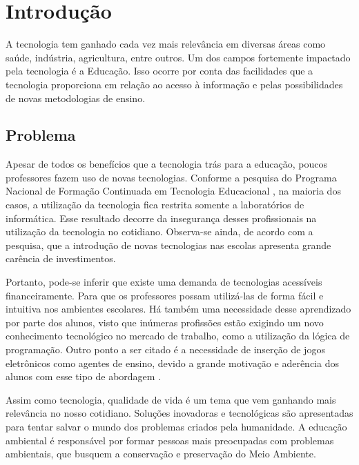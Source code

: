 
\chapter{Introdução}\label{intro}

A tecnologia tem ganhado cada vez mais relevância em diversas áreas como saúde, indústria, agricultura, entre outros. Um dos campos fortemente impactado pela tecnologia é a Educação. Isso ocorre por conta das facilidades que a tecnologia proporciona em relação ao acesso à informação e pelas possibilidades de novas metodologias de ensino. 


\section{Problema}

Apesar de todos os benefícios que a tecnologia trás para a educação, poucos professores fazem uso de novas tecnologias. Conforme a pesquisa do Programa Nacional de Formação Continuada em Tecnologia Educacional \cite{suenia_andre_2012} , na maioria dos casos, a utilização da tecnologia fica restrita somente a laboratórios de informática. Esse resultado decorre da insegurança desses profissionais na utilização da tecnologia no cotidiano. Observa-se ainda, de acordo com a pesquisa, que a introdução de novas tecnologias nas escolas apresenta grande carência de investimentos.

Portanto, pode-se inferir que existe uma demanda de tecnologias acessíveis financeiramente. Para que os professores possam utilizá-las de forma fácil e intuitiva nos ambientes escolares. Há também uma necessidade desse aprendizado por parte dos alunos, visto que inúmeras profissões estão exigindo um novo conhecimento tecnológico no mercado de trabalho, como a utilização da lógica de programação. Outro ponto a ser citado é a necessidade de inserção de jogos eletrônicos como agentes de ensino, devido a grande motivação e aderência dos alunos com esse tipo de abordagem \cite{kaue_tatiane_marcos_2017}.

Assim como tecnologia, qualidade de vida é um tema que vem ganhando mais relevância no nosso cotidiano. Soluções inovadoras e tecnológicas são apresentadas para tentar salvar o mundo dos problemas criados pela humanidade. A educação ambiental é responsável por formar pessoas mais preocupadas com problemas ambientais, que busquem a conservação e preservação do Meio Ambiente.

